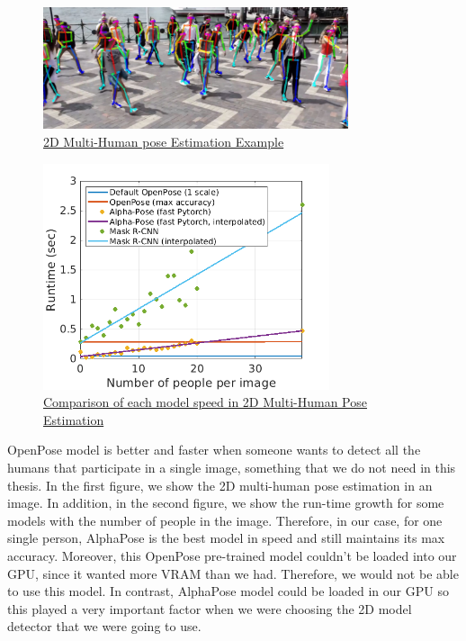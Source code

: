 \begin{figure}[h]
	\centering
	\includegraphics[width=0.8\textwidth]{figures/Implementation/MultiPerson.png}
	\captionsetup{labelformat=empty}
	\caption{\href{https://github.com/CMU-Perceptual-Computing-Lab/openpose}
	{2D Multi-Human pose Estimation Example}}
\end{figure}

\pagebreak

 \begin{figure}[h]
	\centering
	\includegraphics[width=0.75\textwidth]{figures/Implementation/openpose_vs_competition.png}
	\captionsetup{labelformat=empty}
	\caption{\href{https://raw.githubusercontent.com/CMU-Perceptual-Computing-Lab/openpose/master/.github/media/openpose_vs_competition.png}
	{Comparison of each model speed in 2D Multi-Human Pose Estimation}}
\end{figure}

OpenPose model is better and faster when someone wants to detect all the humans that participate in a single image, something that we do not need in this thesis. In the first figure, we show the 2D multi-human pose estimation in an image. In addition, in the second figure, we show the run-time growth for some models with the number of people in the image. Therefore, in our case, for one single person, AlphaPose is the best model in speed and still maintains its max accuracy. Moreover, this OpenPose pre-trained model couldn't be loaded into our GPU, since it wanted more VRAM than we had. Therefore, we would not be able to use this model. In contrast, AlphaPose model could be loaded in our GPU so this played a very important factor when we were choosing the 2D model detector that we were going to use.\\



